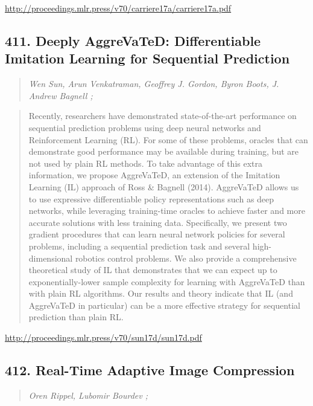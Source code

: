 \documentclass{article}
\begin{document}
\href{http://proceedings.mlr.press/v70/carriere17a/carriere17a.pdf}{http://proceedings.mlr.press/v70/carriere17a/carriere17a.pdf}

\subsection{411. Deeply AggreVaTeD: Differentiable Imitation Learning for Sequential Prediction}

\begin{quote}
\footnotesize{\textit{Wen Sun, Arun Venkatraman, Geoffrey J. Gordon, Byron Boots, J. Andrew Bagnell ;}}
\end{quote}

\begin{quote}
    Recently, researchers have demonstrated state-of-the-art performance on sequential prediction problems using deep neural networks and Reinforcement Learning (RL). For some of these problems, oracles that can demonstrate good performance may be available during training, but are not used by plain RL methods. To take advantage of this extra information, we propose AggreVaTeD, an extension of the Imitation Learning (IL) approach of Ross \& Bagnell (2014). AggreVaTeD allows us to use expressive differentiable policy representations such as deep networks, while leveraging training-time oracles to achieve faster and more accurate solutions with less training data. Specifically, we present two gradient procedures that can learn neural network policies for several problems, including a sequential prediction task and several high-dimensional robotics control problems. We also provide a comprehensive theoretical study of IL that demonstrates that we can expect up to exponentially-lower sample complexity for learning with AggreVaTeD than with plain RL algorithms. Our results and theory indicate that IL (and AggreVaTeD in particular) can be a more effective strategy for sequential prediction than plain RL.  \end{quote}

\href{http://proceedings.mlr.press/v70/sun17d/sun17d.pdf}{http://proceedings.mlr.press/v70/sun17d/sun17d.pdf}

\subsection{412. Real-Time Adaptive Image Compression}

\begin{quote}
\footnotesize{\textit{Oren Rippel, Lubomir Bourdev ;}}
\end{quote}
\end{document}

